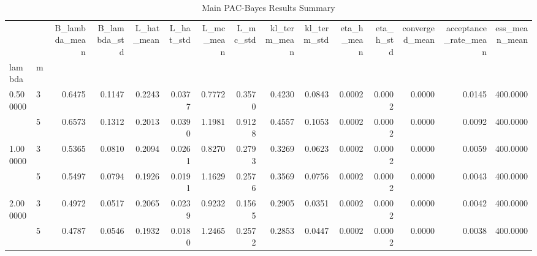 \begin{table}
\caption{Main PAC-Bayes Results Summary}
\label{tab:main_results}
\begin{tabular}{llrrrrrrrrrrrrr}
\toprule
 &  & B_lambda_mean & B_lambda_std & L_hat_mean & L_hat_std & L_mc_mean & L_mc_std & kl_term_mean & kl_term_std & eta_h_mean & eta_h_std & converged_mean & acceptance_rate_mean & ess_mean_mean \\
lambda & m &  &  &  &  &  &  &  &  &  &  &  &  &  \\
\midrule
\multirow[t]{2}{*}{0.500000} & 3 & 0.6475 & 0.1147 & 0.2243 & 0.0377 & 0.7772 & 0.3570 & 0.4230 & 0.0843 & 0.0002 & 0.0002 & 0.0000 & 0.0145 & 400.0000 \\
 & 5 & 0.6573 & 0.1312 & 0.2013 & 0.0390 & 1.1981 & 0.9128 & 0.4557 & 0.1053 & 0.0002 & 0.0002 & 0.0000 & 0.0092 & 400.0000 \\
\cline{1-15}
\multirow[t]{2}{*}{1.000000} & 3 & 0.5365 & 0.0810 & 0.2094 & 0.0261 & 0.8270 & 0.2793 & 0.3269 & 0.0623 & 0.0002 & 0.0002 & 0.0000 & 0.0059 & 400.0000 \\
 & 5 & 0.5497 & 0.0794 & 0.1926 & 0.0191 & 1.1629 & 0.2576 & 0.3569 & 0.0756 & 0.0002 & 0.0002 & 0.0000 & 0.0043 & 400.0000 \\
\cline{1-15}
\multirow[t]{2}{*}{2.000000} & 3 & 0.4972 & 0.0517 & 0.2065 & 0.0239 & 0.9232 & 0.1565 & 0.2905 & 0.0351 & 0.0002 & 0.0002 & 0.0000 & 0.0042 & 400.0000 \\
 & 5 & 0.4787 & 0.0546 & 0.1932 & 0.0180 & 1.2465 & 0.2572 & 0.2853 & 0.0447 & 0.0002 & 0.0002 & 0.0000 & 0.0038 & 400.0000 \\
\cline{1-15}
\bottomrule
\end{tabular}
\end{table}
